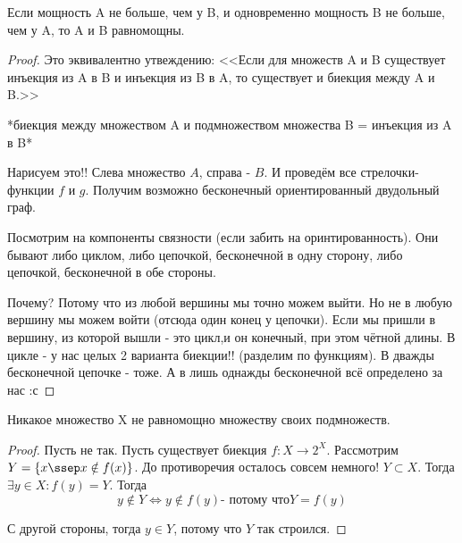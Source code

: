 \begin{theorem} \thmslashn

	Если мощность A не больше, чем у B, и одновременно мощность B не больше, чем у A, то A и B равномощны.
	\begin{proof} \thmslashn
	
		Это эквивалентно утвеждению: <<Если для множеств A и B существует инъекция из A в B и инъекция из B в A, то существует и биекция между A и B.>> 
		
		*биекция между множеством A и подмножеством множества B = инъекция из A в B* 
		
		Нарисуем это!! Слева множество $A$, справа - $B$. И проведём все стрелочки-функции $f$ и $g$. Получим возможно бесконечный ориентированный двудольный граф. 
		
		Посмотрим на компоненты связности (если забить на оринтированность). Они бывают либо циклом, либо цепочкой, бесконечной в одну сторону, либо цепочкой, бесконечной в обе стороны.
		
		Почему? Потому что из любой вершины мы точно можем выйти. Но не в любую вершину мы можем войти (отсюда один конец у цепочки). Если мы пришли в вершину, из которой вышли - это цикл,и он конечный, при этом чётной длины.
		В цикле - у нас целых 2 варианта биекции!! (разделим по функциям). В дважды бесконечной цепочке - тоже. А в лишь однажды бесконечной всё определено за нас :с
	\end{proof}
\end{theorem}


\begin{theorem} \thmslashn

	Никакое множество X не равномощно множеству своих подмножеств.
	\begin{proof} \thmslashn
	
		Пусть не так. Пусть существует биекция $f: X \rightarrow 2^X$. Рассмотрим $Y = \{ x \ssep x \notin f(x) \}$. До противоречия осталось совсем немного! $Y \subset X$. Тогда $\exists y \in X : f(y) = Y$. Тогда
		\[y \notin Y \iff y \notin f(y) \text{- потому что} Y = f(y)\]
		
		С другой стороны, тогда $y \in Y$, потому что $Y$ так строился. 
	\end{proof}
\end{theorem}




